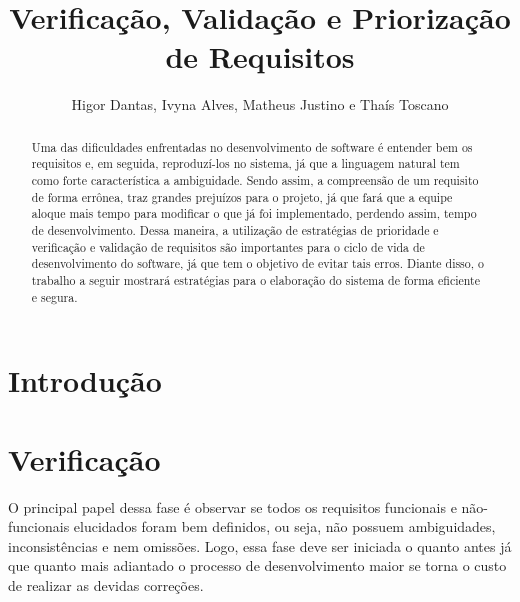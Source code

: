 \documentclass[runningheads]{llncs}
\begin{document}
%
\title{Verificação, Validação e Priorização de Requisitos}
%
\author{Higor Dantas,
Ivyna Alves, Matheus Justino e
Thaís Toscano}
%
%
%
\maketitle              %
%
\begin{abstract}
Uma das dificuldades enfrentadas no desenvolvimento de software é entender bem os requisitos e, em seguida, reproduzí-los no sistema, já que a linguagem natural tem como forte característica a ambiguidade. Sendo assim, a compreensão de um requisito de forma errônea, traz grandes prejuízos para o projeto, já que fará que a equipe aloque mais tempo para modificar o que já foi implementado, perdendo assim, tempo de desenvolvimento. Dessa maneira, a utilização de estratégias de prioridade e verificação e validação de requisitos são importantes para o ciclo de vida de desenvolvimento do software, já que tem o objetivo de evitar tais erros. Diante disso, o trabalho a seguir mostrará estratégias para o elaboração do sistema de forma eficiente e segura.

\end{abstract}
%
%
%
\section{Introdução}

\section{Verificação}
O principal papel dessa fase é observar se todos os requisitos funcionais e não-funcionais elucidados foram bem definidos, ou seja, não possuem ambiguidades, inconsistências e nem omissões. Logo, essa fase deve ser iniciada o quanto antes já que quanto mais adiantado o processo de desenvolvimento maior se torna o custo de realizar as devidas correções.
\end{document}
